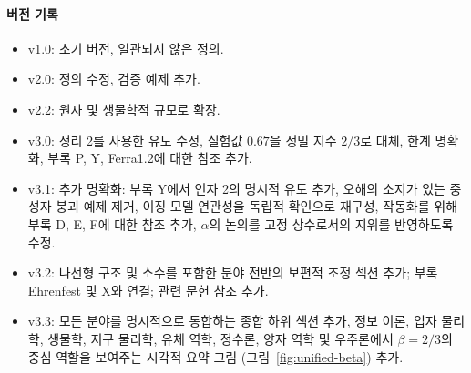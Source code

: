 \documentclass[11pt,a4paper]{article}
\begin{document}
	\paragraph*{버전 기록}
	\begin{itemize}
		\item v1.0: 초기 버전, 일관되지 않은 정의.
		\item v2.0: 정의 수정, 검증 예제 추가.
		\item v2.2: 원자 및 생물학적 규모로 확장.
		\item v3.0: 정리 2를 사용한 유도 수정, 실험값 \(0.67\)을 정밀 지수 \(2/3\)로 대체, 한계 명확화, 부록 P, Y, Ferra1.2에 대한 참조 추가.
		\item v3.1: 추가 명확화: 부록 Y에서 인자 2의 명시적 유도 추가, 오해의 소지가 있는 중성자 붕괴 예제 제거, 이징 모델 연관성을 독립적 확인으로 재구성, 작동화를 위해 부록 D, E, F에 대한 참조 추가, \(\alpha\)의 논의를 고정 상수로서의 지위를 반영하도록 수정.
		\item v3.2: 나선형 구조 및 소수를 포함한 분야 전반의 보편적 조정 섹션 추가; 부록 Ehrenfest 및 X와 연결; 관련 문헌 참조 추가.
		\item v3.3: 모든 분야를 명시적으로 통합하는 종합 하위 섹션 추가, 정보 이론, 입자 물리학, 생물학, 지구 물리학, 유체 역학, 정수론, 양자 역학 및 우주론에서 \(\beta = 2/3\)의 중심 역할을 보여주는 시각적 요약 그림 (그림~\ref{fig:unified-beta}) 추가.
	\end{itemize}
	
\end{document}
